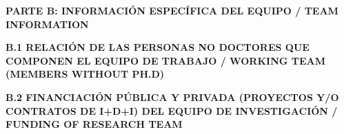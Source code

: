 \documentclass[a4paper,11pt,oneside]{article}
\begin{document}

\newpage
\setcounter{page}{1}


\begin{tcolorbox}[colback=yellow,arc=0pt,outer arc=0pt,colframe=black,boxrule=0.6pt,left=0mm]
  \noindent\textbf{PARTE B: INFORMACIÓN ESPECÍFICA DEL EQUIPO / TEAM INFORMATION}
\end{tcolorbox}

\vspace{12pt}
\noindent\textbf{B.1 RELACIÓN DE LAS PERSONAS NO DOCTORES QUE COMPONEN EL EQUIPO DE TRABAJO / WORKING TEAM (MEMBERS WITHOUT PH.D) }




\noindent\textbf{B.2 FINANCIACIÓN PÚBLICA Y PRIVADA (PROYECTOS Y/O CONTRATOS DE I+D+I) DEL EQUIPO DE INVESTIGACIÓN / FUNDING OF RESEARCH TEAM}
\vspace{12pt}




\newpage
\setcounter{page}{1}


\end{document}

